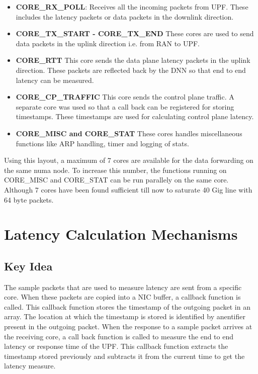 \begin{itemize}
	\item \textbf{CORE\_RX\_POLL}: Receives all the incoming packets from UPF. These includes the latency packets or data packets in the downlink direction.
	\item \textbf{CORE\_TX\_START - CORE\_TX\_END}
	      These cores are used to send data packets in the uplink  direction i.e. from RAN to UPF.
	\item \textbf{CORE\_RTT}
	      This core sends the data plane latency packets in the uplink direction. These packets are reflected back by the DNN so that end to end latency can be measured.
	\item \textbf{CORE\_CP\_TRAFFIC} This core sends the control plane traffic. A separate core was used so that a call back can be registered for storing timestamps. These timestamps are used for calculating control plane latency.
	\item \textbf{CORE\_MISC and CORE\_STAT}
	      These cores handles miscellaneous functions like ARP handling, timer and logging of stats.
\end{itemize}
Using this layout, a maximum of 7 cores are available for the data forwarding on the same numa node.
To increase this number, the functions running on CORE\_MISC and CORE\_STAT can be run parallely on the same core. Although 7 cores have been found sufficient till now to saturate 40 Gig line with 64 byte packets.

\section{Latency Calculation Mechanisms}
\subsection{Key Idea \label{subsec:KeyIdeaCPL}}
The sample packets that are used to measure latency are sent from a specific core.
When these packets are copied into a NIC buffer, a callback function is called.
This callback function stores the timestamp of the outgoing packet in an array.
The location at which the timestamp is stored is identified by anentifier
present in the outgoing packet. When the  response to a sample packet arrives
at the receiving core, a call back function is called to measure the end to
end latency or response time of the UPF. This callback function extracts the
timestamp stored previously and subtracts it from the current time to get the latency measure.

